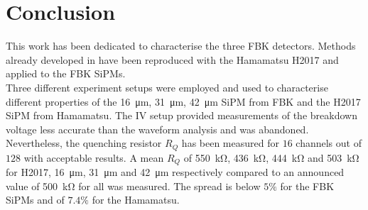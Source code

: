 \chapter{Conclusion}
\label{ch:Conclusion}

This work has been dedicated to characterise the three FBK detectors. Methods already developed in \cite{Girard2018CharacterisationDistributions} have been reproduced with the Hamamatsu H2017 and applied to the FBK SiPMs. \\
Three different experiment setups were employed and used to characterise different properties of the \SI{16}{\micro m}, \SI{31}{\micro m}, \SI{42}{\micro m} SiPM from FBK and the H2017 SiPM from Hamamatsu.
The IV setup provided measurements of the breakdown voltage less accurate than the waveform analysis and was abandoned. Nevertheless, the quenching resistor $R_Q$ has been measured for $16$ channels out of $128$ with acceptable results. A mean $R_Q$ of \SI{550}{\kilo \ohm}, \SI{436}{\kilo \ohm}, \SI{444}{\kilo \ohm}  and \SI{503}{\kilo \ohm} for H2017, \SI{16}{\micro m}, \SI{31}{\micro m} and \SI{42}{\micro m} respectively compared to an announced value of  \SI{500}{\kilo \ohm} for all was measured. The spread is below $5\%$ for the FBK SiPMs and of $7.4\%$ for the Hamamatsu. 
\\

